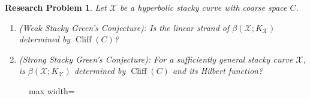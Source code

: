 \documentclass[11pt,reqno]{amsart}
\newtheorem{problem}[lemma]{Research Problem}
\theoremstyle{remark}
\newcommand{\cliff}{\operatorname{Cliff}}
\newcommand{\cX}{\mathcal{X}}
\begin{document}
\begin{problem}\label{prob:ws}
Let $\cX$ be a hyperbolic stacky curve with coarse space $C$.
\begin{enumerate}
\item (Weak Stacky Green's Conjecture):  Is the linear strand of $\beta(\cX;K_{\cX})$ determined by $\cliff(C)$?
\item (Strong Stacky Green's Conjecture): For a sufficiently general stacky curve $\cX$, is $\beta(\cX;K_{\cX})$ determined by $\cliff(C)$ and its Hilbert function?
\end{enumerate} 
\end{problem}



\begin{figure}
\centering
\begin{adjustbox}{max width=\linewidth}
\begin{tabular}{@{}l@{}}


\end{tabular}
\end{adjustbox}
\end{figure}
\end{document}

